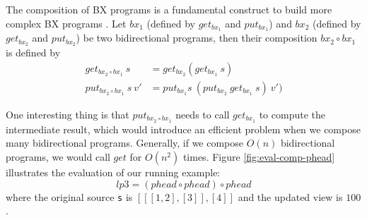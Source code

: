 The composition of BX programs is a fundamental construct to build more complex BX programs \cite{Bohannon06relationallenses:, Bohannon:2008:BRL:1328438.1328487}. Let $bx_1$ (defined by $get_{bx_1}$ and $put_{bx_1}$) and $bx_2$ (defined by $get_{bx_2}$ and $put_{bx_2}$) be two bidirectional programs, then their composition $bx_2 \circ bx_1$ is defined by
\begin{align}
get_{bx_2 \circ bx_1}~s &= get_{bx_2} (get_{bx_1}~s)\\
put_{bx_2 \circ bx_1}~s~v' &= put_{bx_1} s~(put_{bx_2}~ get_{bx_1}~s)~v')
\end{align}





One interesting thing is that $put_{bx_2 \circ bx_1}$ needs to call $get_{bx_1}$ to compute the intermediate result, which would introduce an efficient problem when we compose many bidirectional programs. Generally, if we compose $O(n)$ bidirectional programs, we would call $get$ for $O(n^2)$ times. Figure \ref{fig:eval-comp-phead} illustrates the evaluation of our running example:
\[
lp3 = (phead \circ phead) \circ phead
\]
where the original source \texttt{s} is ${[[[1,2],[3]],[4]]}$ and the updated view is ${100}$.

